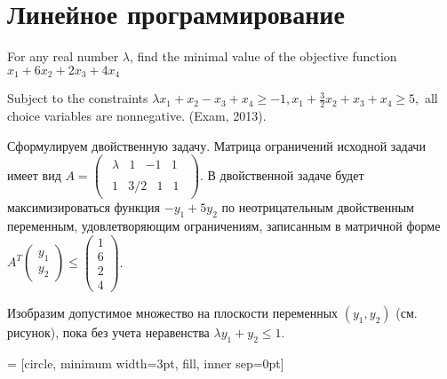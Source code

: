 \section{Линейное программирование}

\begin{problem}
For any real number $\lambda $, find the minimal value of the objective function $x_{1} +6x_{2} +2x_{3} +4x_{4} $

Subject to the constraints $\lambda x_{1} +x_{2} -x_{3} +x_{4} \ge -1,  x_{1} +\frac{3}{2} x_{2} +x_{3} +x_{4} \ge 5,$ all choice variables are nonnegative. (Exam, 2013).
\end{problem}


\begin{solution}
Сформулируем двойственную задачу. Матрица ограничений исходной задачи имеет вид $A=\left(\begin{array}{c} {\begin{array}{cccc} {\lambda } & {1} & {-1} & {1} \end{array}} \\ {\begin{array}{cccc} {1} & {3/2} & {1} & {1} \end{array}} \end{array}\right)$. В двойственной задаче будет максимизироваться функция $-y_{1} +5y_{2} $ по неотрицательным двойственным переменным, удовлетворяющим ограничениям, записанным в матричной форме $A^{T} \left(\begin{array}{c} {y_{1} } \\ {y_{2} } \end{array}\right)\le \left(\begin{array}{c} {1} \\ {6} \\ {2} \\ {4} \end{array}\right)$.

Изобразим допустимое множество на плоскости переменных $(y_{1} ,y_{2} )$ (см. рисунок), пока без учета неравенства $\lambda y_{1} +y_{2} \le 1$.



 = [circle, minimum width=3pt, fill, inner sep=0pt]


\end{solution}
